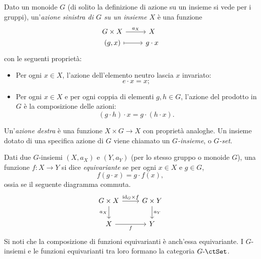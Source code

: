 \begin{example}\label{ex_cat_g_insiemi}
 Dato un monoide \(G\) (di solito la definizione di azione su un insieme si vede per i gruppi), un'\emph{azione sinistra di \(G\) su un insieme \(X\)} è una funzione
 \[
  \begin{tikzcd}[row sep=0]
   G\times X \ar{r}{a_X} & X \\
   (g,x) \ar[mapsto]{r} & g\cdot x
  \end{tikzcd}
 \]
 con le seguenti proprietà:
 \begin{itemize}
  \item Per ogni \(x\in X\), l'azione dell'elemento neutro lascia \(x\) invariato:
        \[
         e\cdot x = x ;
        \]
  \item Per ogni \(x\in X\) e per ogni coppia di elementi \(g,h\in G\), l'azione del prodotto in \(G\) è la composizione delle azioni:
        \[
         (g\cdot h)\cdot x = g\cdot(h\cdot x) .
        \]
 \end{itemize}
 Un'\emph{azione destra} è una funzione \(X\times G\to X\) con proprietà analoghe.
 Un insieme dotato di una specifica azione di \(G\) viene chiamato un \emph{\(G\)-insieme}, o \emph{\(G\)-set}.

 Dati due \(G\)-insiemi \((X,a_X)\) e \((Y,a_Y)\) (per lo stesso gruppo o monoide \(G\)), una funzione \(f\colon X\to Y\) si dice \emph{equivariante} se per ogni \(x\in X\) e \(g\in G\),
 \[
  f(g\cdot x) = g\cdot f(x) ,
 \]
 ossia se il seguente diagramma commuta.
 \[
  \begin{tikzcd}
   G\times X \ar{r}{\id_G\times f} \ar[d, "a_X"'] & G\times Y \ar{d}{a_Y} \\
   X \ar[r, "f"'] & Y
  \end{tikzcd}
 \]
 Si noti che la composizione di funzioni equivarianti è anch'essa equivariante. I \(G\)-insiemi e le funzioni equivarianti tra loro formano la categoria \(G\emdash\ctSet\).
\end{example}
